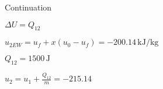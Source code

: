 Continuation

\( \Delta U = Q_{12} \)  

\( u_{2EW} = u_{f} + x (u_{0} - u_{f}) = -200.14 \, \text{kJ/kg} \)  

\( Q_{12} = 1500 \, \text{J} \)  

\( u_2 = u_1 + \frac{Q_{12}}{m} = -215.14 \)